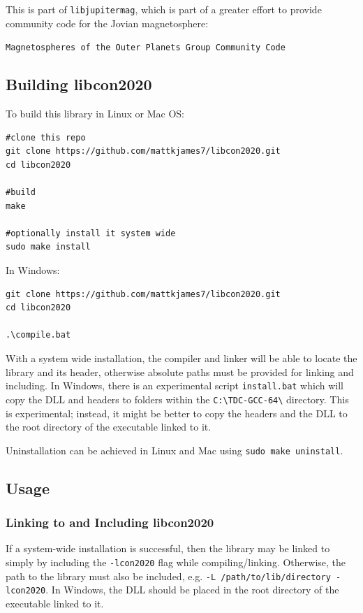 	This is part of \texttt{libjupitermag}, which is part of a greater effort to provide community code for the Jovian magnetosphere:
	
	\texttt{Magnetospheres of the Outer Planets Group Community Code}
	
	\subsection{Building libcon2020}
	
	To build this library in Linux or Mac OS:
	
	\begin{verbatim}
#clone this repo
git clone https://github.com/mattkjames7/libcon2020.git
cd libcon2020
	
#build
make
	
#optionally install it system wide
sudo make install
	\end{verbatim}
	
	In Windows:
	
	\begin{verbatim}
git clone https://github.com/mattkjames7/libcon2020.git
cd libcon2020
	
.\compile.bat
	\end{verbatim}
	
	With a system wide installation, the compiler and linker will be able to locate the library and its header, otherwise absolute paths must be provided for linking and including. In Windows, there is an experimental script \texttt{install.bat} which will copy the DLL and headers to folders within the \texttt{C:\textbackslash TDC-GCC-64\textbackslash} directory. This is experimental; instead, it might be better to copy the headers and the DLL to the root directory of the executable linked to it.
	
	Uninstallation can be achieved in Linux and Mac using \texttt{sudo make uninstall}.
	
	\subsection{Usage}
	
	\subsubsection{Linking to and Including libcon2020}
	
	If a system-wide installation is successful, then the library may be linked to simply by including the \texttt{-lcon2020} flag while compiling/linking. Otherwise, the path to the library must also be included, e.g. \texttt{-L /path/to/lib/directory -lcon2020}. In Windows, the DLL should be placed in the root directory of the executable linked to it.
	
